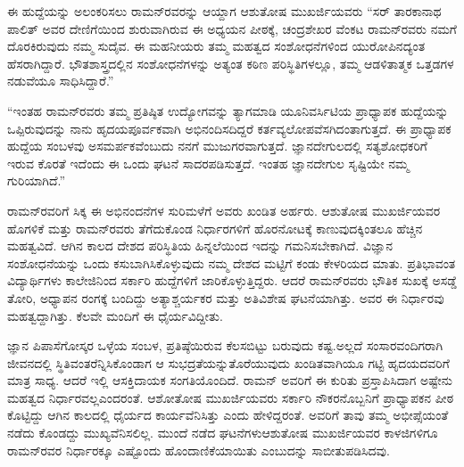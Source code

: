 ಈ ಹುದ್ದೆಯನ್ನು ಅಲಂಕರಿಸಲು ರಾಮನ್‍ರವರನ್ನು ಆಯ್ದಾಗ ಆಶುತೋಷ ಮುಖರ್ಜಿಯವರು \enginline{-} “ಸರ್ ತಾರಕಾನಾಥ ಪಾಲಿತ್ ಅವರ ದೇಣಿಗೆಯಿಂದ ಶುರುವಾಗಿರುವ ಈ ಅಧ್ಯಯನ ಪೀಠಕ್ಕೆ, ಚಂದ್ರಶೇಖರ ವೆಂಕಟ ರಾಮನ್‍ರವರು ನಮಗೆ ದೊರಕಿರುವುದು ನಮ್ಮ ಸುದೈವ. ಈ ಮಹನೀಯರು ತಮ್ಮ ಮಹತ್ವದ ಸಂಶೋಧನೆಗಳಿಂದ ಯುರೋಪಿನದ್ಯಂತ ಹೆಸರಾಗಿದ್ದಾರೆ. ಭೌತಶಾಸ್ತ್ರದಲ್ಲಿನ ಸಂಶೋಧನೆಗಳನ್ನು ಅತ್ಯಂತ ಕಠಿಣ ಪರಿಸ್ಥಿತಿಗಳಲ್ಲೂ, ತಮ್ಮ ಆಡಳಿತಾತ್ಮಕ ಒತ್ತಡಗಳ ನಡುವೆಯೂ ಸಾಧಿಸಿದ್ದಾರೆ.”

“ಇಂತಹ ರಾಮನ್‍ರವರು ತಮ್ಮ ಪ್ರತಿಷ್ಠಿತ ಉದ್ಯೋಗವನ್ನು ತ್ಯಾಗಮಾಡಿ ಯೂನಿವರ್ಸಿಟಿಯ ಪ್ರಾಧ್ಯಾಪಕ ಹುದ್ದೆಯನ್ನು ಒಪ್ಪಿರುವುದನ್ನು ನಾನು ಹೃದಯಪೂರ್ವಕವಾಗಿ ಅಭಿನಂದಿಸದಿದ್ದರೆ ಕರ್ತವ್ಯಲೋಪವೆಸಗಿದಂತಾಗುತ್ತದೆ. ಈ ಪ್ರಾಧ್ಯಾಪಕ ಹುದ್ದೆಯ ಸಂಬಳವು ಅಸಮರ್ಪಕವೆಂಬುದು ನನಗೆ ಮುಜುಗರವಾಗುತ್ತದೆ. ಜ್ಞಾನದೇಗುಲದಲ್ಲಿ ಸತ್ಯಶೋಧಕರಿಗೆ ಇರುವ ಕೊರತೆ ಇದೆಂದು ಈ ಒಂದು ಘಟನೆ ಸಾದರಪಡಿಸುತ್ತದೆ. ಇಂತಹ ಜ್ಞಾನದೇಗುಲ ಸೃಷ್ಟಿಯೇ ನಮ್ಮ ಗುರಿಯಾಗಿದೆ.”

ರಾಮನ್‍ರವರಿಗೆ ಸಿಕ್ಕ ಈ ಅಭಿನಂದನೆಗಳ ಸುರಿಮಳೆಗೆ ಅವರು ಖಂಡಿತ ಅರ್ಹರು. ಆಶುತೋಷ ಮುಖರ್ಜಿಯವರ ಹೊಗಳಿಕೆ ಮತ್ತು ರಾಮನ್‍ರವರು ತೆಗೆದುಕೊಂಡ ನಿರ್ಧಾರಗಳಿಗೆ ಹೊರನೋಟಕ್ಕೆ ಕಾಣುವುದಕ್ಕಿಂತಲೂ ಹೆಚ್ಚಿನ ಮಹತ್ವವಿದೆ. ಆಗಿನ ಕಾಲದ ದೇಶದ ಪರಿಸ್ಥಿತಿಯ ಹಿನ್ನಲೆಯಿಂದ ಇದನ್ನು ಗಮನಿಸಬೇಕಾಗಿದೆ. ವಿಜ್ಞಾನ ಸಂಶೋಧನೆಯನ್ನು ಒಂದು ಕಸುಬಾಗಿಸಿಕೊಳ್ಳುವುದು ನಮ್ಮ ದೇಶದ ಮಟ್ಟಿಗೆ ಕಂಡು ಕೇಳರಿಯದ ಮಾತು. ಪ್ರತಿಭಾವಂತ ವಿದ್ಯಾರ್ಥಿಗಳು ಕಾಲೇಜಿನಿಂದ ಸರ್ಕಾರಿ ಹುದ್ದೆಗಳಿಗೆ ಜಾರಿಕೊಳ್ಳುತ್ತಿದ್ದರು. ಆದರೆ ರಾಮನ್‍ರವರು ಭೌತಿಕ ಸುಖಕ್ಕೆ ಅಸಡ್ಡೆ ತೋರಿ, ಅಧ್ಯಾಪನ ರಂಗಕ್ಕೆ ಬಂದಿದ್ದು ಅತ್ಯಾಶ್ಚರ್ಯಕರ ಮತ್ತು ಅತಿವಿಶೇಷ ಘಟನೆಯಾಗಿತ್ತು. ಅವರ ಈ ನಿರ್ಧಾರವು ಮಹತ್ವದ್ದಾಗಿತ್ತು. ಕೆಲವೇ ಮಂದಿಗೆ ಈ ಧೈರ್ಯವಿದ್ದೀತು.

ಜ್ಞಾನ ಪಿಪಾಸೆಗೋಸ್ಕರ ಒಳ್ಳೆಯ ಸಂಬಳ, ಪ್ರತಿಷ್ಠೆಯಿರುವ ಕೆಲಸಬಿಟ್ಟು ಬರುವುದು ಕಷ್ಟ.\break ಅಲ್ಲದೆ ಸಂಸಾರವಂದಿಗರಾಗಿ ಜೀವನದಲ್ಲಿ ಸ್ಥಿತಿವಂತರೆನ್ನಿಸಿಕೊಂಡಾಗ ಆ ಸುಭದ್ರತೆಯನ್ನು\break ತೊರೆಯುವುದು ಖಂಡಿತವಾಗಿಯೂ ಗಟ್ಟಿ ಹೃದಯದವರಿಗೆ ಮಾತ್ರ ಸಾಧ್ಯ. ಆದರೆ ಇಲ್ಲಿ ಆಸಕ್ತಿದಾಯಕ ಸಂಗತಿಯೊಂದಿದೆ. ರಾಮನ್ ಅವರಿಗೆ ಈ ಕುರಿತು ಪ್ರಸ್ತಾಪಿಸಿದಾಗ ಅಷ್ಟೇನು ಮಹತ್ವದ ನಿರ್ಧಾರವಲ್ಲ\break ಎಂದರಂತೆ. ಆಶೋತೋಷ ಮುಖರ್ಜಿಯವರು ಸರ್ಕಾರಿ ನೌಕರನೊಬ್ಬನಿಗೆ ಪ್ರಾಧ್ಯಾಪಕನ ಪೀಠ ಕೊಟ್ಟಿದ್ದು ಆಗಿನ ಕಾಲದಲ್ಲಿ ಧೈರ್ಯದ ಕಾರ್ಯವೆನಿಸಿತ್ತು ಎಂದು ಹೇಳಿದ್ದರಂತೆ. ಅವರಿಗೆ ತಾವು ತಮ್ಮ ಅಭೀಪ್ಸೆಯಂತೆ ನಡೆದು ಕೊಂಡದ್ದು ಮುಖ್ಯವೆನಿಸಲಿಲ್ಲ. ಮುಂದೆ ನಡೆದ ಘಟನೆಗಳು\break ಆಶುತೋಷ ಮುಖರ್ಜಿಯವರ ಕಾಳಜಿಗಳಿಗೂ ರಾಮನ್‍ರವರ ನಿರ್ಧಾರಕ್ಕೂ ಎಷ್ಟೊಂದು ಹೊಂದಾ\-ಣಿಕೆಯಾಯಿತು ಎಂಬುದನ್ನು ಸಾಬೀತುಪಡಿಸಿದವು.

